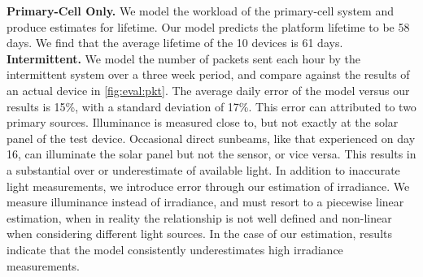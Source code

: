 \vspace{-6pt}
\noindent
\textbf{Primary-Cell Only.}
We model the workload of the primary-cell system and produce estimates for
lifetime.  Our model predicts the platform lifetime
to be 58 days.  We find that the average lifetime of the 10 devices is 61 days.
\\

\vspace{-6pt}
\noindent
\textbf{Intermittent.}
We model the number of packets sent each hour by the
intermittent system over a three week period, and compare against the results of an actual device in
\cref{fig:eval:pkt}.
The average daily error of the model versus our results is 15\%, with a standard deviation of
17\%. This error can attributed to two primary sources. Illuminance is measured
close to, but not exactly at the solar panel of the test device. Occasional
direct sunbeams, like that experienced on day 16, can illuminate the solar
panel but not the sensor, or vice versa. This
results in a substantial over or underestimate of available light. In addition
to inaccurate light measurements, we introduce error through our estimation of
irradiance. We measure illuminance
instead of irradiance, and must resort to a piecewise linear estimation, when
in reality the relationship is not well defined and non-linear when considering
different light sources. In the case of our estimation, results
indicate that the model consistently underestimates high irradiance measurements.\\


